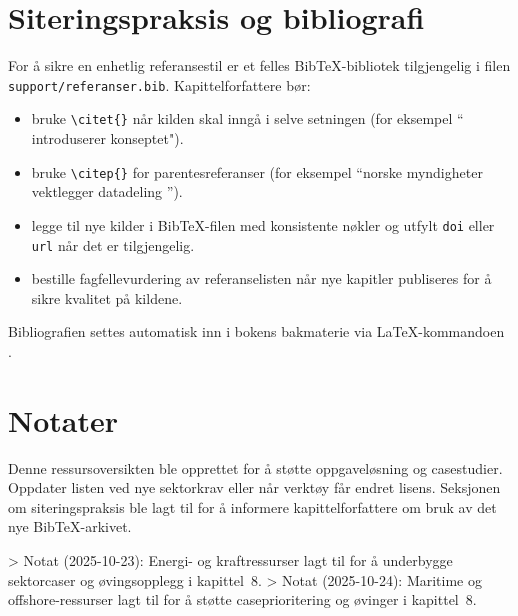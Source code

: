 \section{Siteringspraksis og bibliografi}
For å sikre en enhetlig referansestil er et felles Bib\TeX-bibliotek tilgjengelig i filen \texttt{support/referanser.bib}. Kapittelforfattere bør:
\begin{itemize}
    \item bruke \verb+\citet{}+ når kilden skal inngå i selve setningen (for eksempel ``\citet{grieves2017digital} introduserer konseptet").
    \item bruke \verb+\citep{}+ for parentesreferanser (for eksempel ``norske myndigheter vektlegger datadeling \citep{regjeringen2022datastrategi}'').
    \item legge til nye kilder i Bib\TeX-filen med konsistente nøkler og utfylt \texttt{doi} eller \texttt{url} når det er tilgjengelig.
    \item bestille fagfellevurdering av referanselisten når nye kapitler publiseres for å sikre kvalitet på kildene.
\end{itemize}

Bibliografien settes automatisk inn i bokens bakmaterie via \LaTeX-kommandoen \verb++.

\section{Notater}
Denne ressursoversikten ble opprettet for å støtte oppgaveløsning og casestudier. Oppdater listen ved nye sektorkrav eller når verktøy får endret lisens. Seksjonen om siteringspraksis ble lagt til for å informere kapittelforfattere om bruk av det nye Bib\TeX-arkivet.

> Notat (2025-10-23): Energi- og kraftressurser lagt til for å underbygge sektorcaser og øvingsopplegg i kapittel~8.
> Notat (2025-10-24): Maritime og offshore-ressurser lagt til for å støtte caseprioritering og øvinger i kapittel~8.
